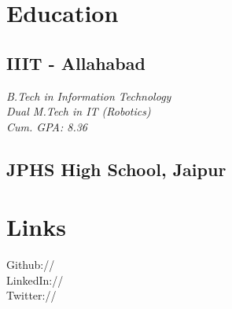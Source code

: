 \documentclass[]{deedy-resume-openfont}
\begin{document}
%
%
\lastupdated

%
%



%
%

\begin{minipage}[t]{0.33\textwidth} 


\section{Education} 

\subsection{IIIT - Allahabad}
\textit{B.Tech in Information Technology\\ Dual M.Tech in IT (Robotics) \\ Cum. GPA: 8.36}
\sectionsep

\subsection{JPHS High School, Jaipur}
\sectionsep


\section{Links} 
Github:// \href{https://github.com/Ellusionists}{} \\
LinkedIn://  \href{https://www.linkedin.com/in/aditya-goel-11a578134/}{} \\
Twitter://  \href{https://twitter.com/itsAdityaGoel}{} \\
\sectionsep


\end{minipage}
\end{document}
